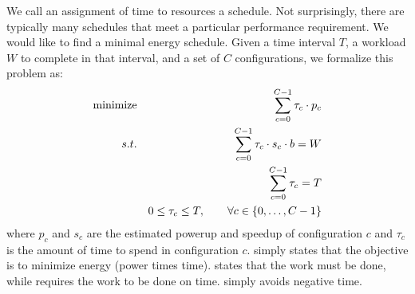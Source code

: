 We call an assignment of time to resources a schedule.  Not
surprisingly, there are typically many schedules that meet a
particular performance requirement.  We would like to find a minimal
energy schedule. Given a time interval $T$, a workload $W$ to
complete in that interval, and a set of $C$ configurations, we
formalize this problem as:
\begin{eqnarray}
  \minimize && \sum_{c=0}^{C-1} \tau_c \cdot p_c \label{eqn:power} \\
  \st %
  && \sum_{c=0}^{C-1} \tau_c \cdot s_c \cdot b =  W \label{eqn:work} \\
  && \sum_{c=0}^{C-1} \tau_c =  T \label{eqn:deadline} \\
  && 0 \le \tau_c \le T, \qquad \forall c \in \{0,\ldots,C-1\} \label{eqn:time}
\end{eqnarray}
where $p_c$ and $s_c$ are the estimated powerup and speedup of
configuration $c$ and $\tau_c$ is the amount of time to spend in
configuration $c$.   simply states that the objective is
to minimize energy (power times time).   states that the
work must be done, while  requires the work to be
done on time.   simply avoids negative time.


